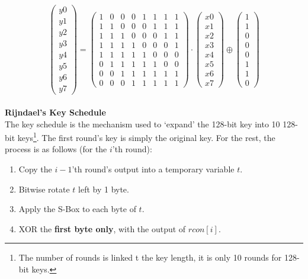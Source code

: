     \begin{equation}
        \begin{pmatrix}
            y0\\y1\\y2\\y3\\y4\\y5\\y6\\y7
        \end{pmatrix}
        =
        \begin{pmatrix}
            1&0&0&0&1&1&1&1\\
            1&1&0&0&0&1&1&1\\
            1&1&1&0&0&0&1&1\\
            1&1&1&1&0&0&0&1\\
            1&1&1&1&1&0&0&0\\
            0&1&1&1&1&1&0&0\\
            0&0&1&1&1&1&1&1\\
            0&0&0&1&1&1&1&1
        \end{pmatrix}
        \cdot
        \begin{pmatrix}
            x0\\x1\\x2\\x3\\x4\\x5\\x6\\x7
        \end{pmatrix}
        \oplus
        \begin{pmatrix}
            1\\1\\0\\0\\0\\1\\1\\0
        \end{pmatrix}
    \end{equation}\\
    \textbf{Rijndael's Key Schedule}\\
    The key schedule is the mechanism used to `expand' the 128-bit key into 10 128-bit keys\footnote{The number of rounds is linked t the key length, it is only 10 rounds for 128-bit keys.}. The first round's key is simply the original key. For the rest, the process is as follows (for the $i$'th round):
    \begin{enumerate}
        \item Copy the $i-1$'th round's output into a temporary variable $t$.
        \item Bitwise rotate $t$ left by 1 byte.
        \item Apply the S-Box to each byte of $t$.
        \item XOR the \textbf{first byte only}, with the output of $rcon[i]$.
    \end{enumerate}
